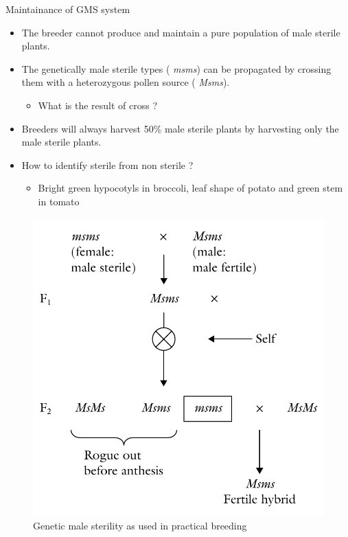 \documentclass[11pt,ignorenonframetext,aspectratio=169]{beamer}
\providecommand{\tightlist}{%
  \setlength{\itemsep}{0pt}\setlength{\parskip}{0pt}}
\begin{document}
\begin{frame}{Maintainance of GMS system}
\protect\hypertarget{maintainance-of-gms-system}{}
\begin{itemize}
\tightlist
\item
  The breeder cannot produce and maintain a pure population of male
  sterile plants.
\item
  The genetically male sterile types ( \emph{msms}) can be propagated by
  crossing them with a heterozygous pollen source ( \emph{Msms}).

  \begin{itemize}
  \tightlist
  \item
    What is the result of cross ?
  \end{itemize}
\item
  Breeders will always harvest 50\% male sterile plants by harvesting
  only the male sterile plants.
\item
  How to identify sterile from non sterile ?

  \begin{itemize}
  \tightlist
  \item
    Bright green hypocotyls in broccoli, leaf shape of potato and green
    stem in tomato
  \end{itemize}
\end{itemize}
\end{frame}

\begin{frame}{}
\protect\hypertarget{section-12}{}
\begin{figure}

{\centering \includegraphics[width=0.5\linewidth]{./images/gms_use} 

}

\caption{Genetic male sterility as used in practical breeding}\label{fig:gms-use}
\end{figure}
\end{frame}
\end{document}
